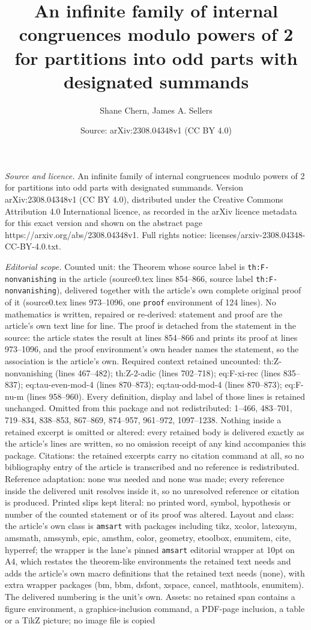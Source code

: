 \documentclass[10pt,a4paper]{amsart}
\title[An infinite family of internal congruences modulo powers of ]{An infinite family of internal congruences modulo powers of 2 for partitions into odd parts with designated summands}
\author{Shane Chern, James A. Sellers}
\date{Source: arXiv:2308.04348v1 (CC BY 4.0)}
\begin{document}
\maketitle

\noindent\emph{Source and licence.} An infinite family of internal congruences modulo powers of 2 for partitions into odd parts with designated summands. Version arXiv:2308.04348v1 (CC BY 4.0), distributed under the Creative Commons Attribution 4.0 International licence, as recorded in the arXiv licence metadata for this exact version and shown on the abstract page https://arxiv.org/abs/2308.04348v1. Full rights notice: licenses/arxiv-2308.04348-CC-BY-4.0.txt.\par\smallskip

\noindent\textit{Editorial scope.} Counted unit: the Theorem whose source label is \texttt{th:F-nonvanishing} in the article (source0.tex lines 854--866, source label \texttt{th:F-nonvanishing}), delivered together with the article's own complete original proof of it (source0.tex lines 973--1096, one \texttt{proof} environment of 124 lines). No mathematics is written, repaired or re-derived: statement and proof are the article's own text line for line. The proof is detached from the statement in the source: the article states the result at lines 854--866 and prints its proof at lines 973--1096, and the proof environment's own header names the statement, so the association is the article's own. Required context retained uncounted: th:Z-nonvanishing (lines 467--482); th:Z-2-adic (lines 702--718); eq:F-xi-rec (lines 835--837); eq:tau-even-mod-4 (lines 870--873); eq:tau-odd-mod-4 (lines 870--873); eq:F-nu-m (lines 958--960). Every definition, display and label of those lines is retained unchanged. Omitted from this package and not redistributed: 1--466, 483--701, 719--834, 838--853, 867--869, 874--957, 961--972, 1097--1238. Nothing inside a retained excerpt is omitted or altered: every retained body is delivered exactly as the article's lines are written, so no omission receipt of any kind accompanies this package. Citations: the retained excerpts carry no citation command at all, so no bibliography entry of the article is transcribed and no reference is redistributed. Reference adaptation: none was needed and none was made; every reference inside the delivered unit resolves inside it, so no unresolved reference or citation is produced. Printed slips kept literal: no printed word, symbol, hypothesis or number of the counted statement or of its proof was altered. Layout and class: the article's own class is \texttt{amsart} with packages including tikz, xcolor, latexsym, amsmath, amssymb, epic, amsthm, color, geometry, etoolbox, enumitem, cite, hyperref; the wrapper is the lane's pinned \texttt{amsart} editorial wrapper at 10pt on A4, which restates the theorem-like environments the retained text needs and adds the article's own macro definitions that the retained text needs (none), with extra wrapper packages (bm, bbm, dsfont, xspace, cancel, mathtools, enumitem). The delivered numbering is the unit's own. Assets: no retained span contains a figure environment, a graphics-inclusion command, a PDF-page inclusion, a table or a TikZ picture; no image file is copied 
\end{document}
